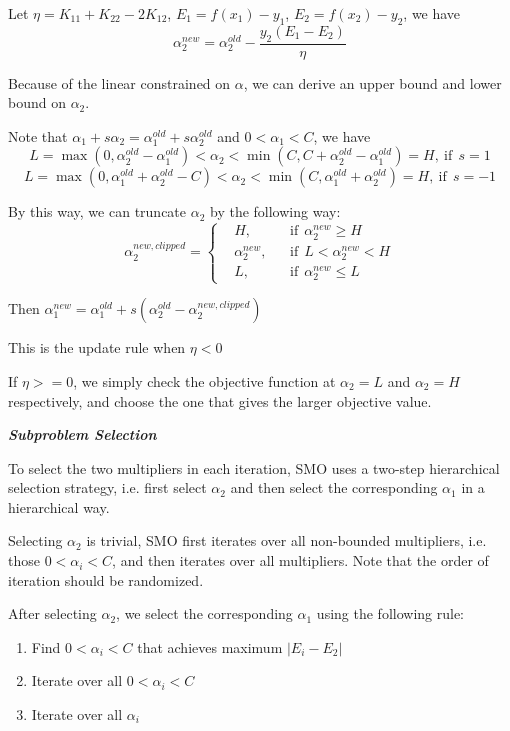 \documentclass[12pt,oneside,a4paper]{article}
\begin{document}
Let $\eta = K_{11} + K_{22} - 2K_{12}$, $E_{1} = f(x_{1}) - y_1$, $E_{2} = f(x_{2}) - y_2$, we have
\begin{equation*}
\alpha_{2}^{new} = \alpha_{2}^{old} - \frac{y_{2}(E_{1} - E_{2})}{\eta}
\end{equation*}

Because of the linear constrained on $\alpha$, we can derive an upper bound and lower bound on $\alpha_2$.

Note that $\alpha_{1} + s\alpha_{2} = \alpha^{old}_{1} + s\alpha^{old}_{2}$ and $0 < \alpha_{1} < C$, we have
$$L = \max(0, \alpha_{2}^{old} - \alpha_{1}^{old}) < \alpha_{2} < \min(C, C + \alpha_{2}^{old} - \alpha_{1}^{old}) = H, ~\mathrm{if} ~~s = 1$$
$$L = \max(0, \alpha_{1}^{old} + \alpha_{2}^{old} - C) < \alpha_{2} < \min(C, \alpha_{1}^{old} + \alpha_{2}^{old}) = H, ~\mathrm{if} ~~s = -1$$

By this way, we can truncate $\alpha_{2}$ by the following way:
$$\alpha_{2}^{new, clipped} = \left\{
\begin{aligned}
&H, & & \mathrm{if}~~ \alpha_{2}^{new} \geq H\\
&\alpha_{2}^{new},  & & \mathrm{if}~~ L < \alpha_{2}^{new} < H\\
&L, & & \mathrm{if}~~ \alpha_{2}^{new} \leq L
\end{aligned}
\right.$$

Then $\alpha_{1}^{new} = \alpha_{1}^{old} + s(\alpha_{2}^{old} - \alpha_{2}^{new,clipped})$

This is the update rule when $\eta < 0$

If $\eta >= 0$, we simply check the objective function at $\alpha_2 = L$ and $\alpha_2 = H$ respectively, and choose the one that gives the larger objective value.
\clearpage

\textbf{\em Subproblem Selection}

To select the two multipliers in each iteration, SMO uses a two-step hierarchical selection strategy, i.e. first select $\alpha_{2}$ and then select the corresponding $\alpha_{1}$ in a hierarchical way.

Selecting $\alpha_{2}$ is trivial, SMO first iterates over all non-bounded multipliers, i.e. those $0 < \alpha_{i} < C$, and then iterates over all multipliers. Note that the order of iteration should be randomized.

After selecting $\alpha_{2}$, we select the corresponding $\alpha_{1}$ using the following rule:\
\begin{enumerate}
\item Find $0 < \alpha_{i} < C$ that achieves maximum $|E_{i} - E_{2}|$
\item Iterate over all $0 < \alpha_{i} < C$
\item Iterate over all $\alpha_{i}$
\end{enumerate}
\end{document}
